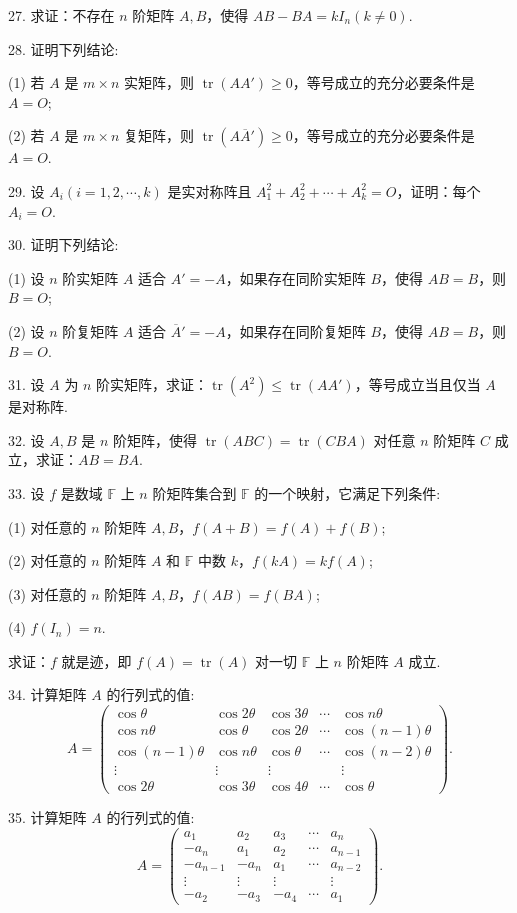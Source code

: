 \documentclass[UTF8, 12pt, fontset=fandol, oneside]{ctexart}
\begin{document}
27. 求证：不存在 $n$ 阶矩阵 $A,B$，使得 $AB-BA=kI_n(k\neq 0)$.

28. 证明下列结论:

(1) 若 $A$ 是 $m\times n$ 实矩阵，则 $\operatorname{tr}(AA')\geq 0$，等号成立的充分必要条件是 $A=O$;

(2) 若 $A$ 是 $m\times n$ 复矩阵，则 $\operatorname{tr}(A\overline{A}')\geq 0$，等号成立的充分必要条件是 $A=O$.

29. 设 $A_i(i=1,2,\cdots,k)$ 是实对称阵且 $A_1^2+A_2^2+\cdots+A_k^2=O$，证明：每个 $A_i=O$.

30. 证明下列结论:

(1) 设 $n$ 阶实矩阵 $A$ 适合 $A'=-A$，如果存在同阶实矩阵 $B$，使得 $AB=B$，则 $B=O$;

(2) 设 $n$ 阶复矩阵 $A$ 适合 $\overline{A}'=-A$，如果存在同阶复矩阵 $B$，使得 $AB=B$，则 $B=O$.

31. 设 $A$ 为 $n$ 阶实矩阵，求证：$\operatorname{tr}(A^2)\leq \operatorname{tr}(AA')$，等号成立当且仅当 $A$ 是对称阵.

32. 设 $A,B$ 是 $n$ 阶矩阵，使得 $\operatorname{tr}(ABC)=\operatorname{tr}(CBA)$ 对任意 $n$ 阶矩阵 $C$ 成立，求证：$AB=BA$.

33. 设 $f$ 是数域 $\mathbb{F}$ 上 $n$ 阶矩阵集合到 $\mathbb{F}$ 的一个映射，它满足下列条件:

(1) 对任意的 $n$ 阶矩阵 $A,B$，$f(A+B)=f(A)+f(B)$;

(2) 对任意的 $n$ 阶矩阵 $A$ 和 $\mathbb{F}$ 中数 $k$，$f(kA)=kf(A)$;

(3) 对任意的 $n$ 阶矩阵 $A,B$，$f(AB)=f(BA)$;

(4) $f(I_n)=n$.

求证：$f$ 就是迹，即 $f(A)=\operatorname{tr}(A)$ 对一切 $\mathbb{F}$ 上 $n$ 阶矩阵 $A$ 成立.

34. 计算矩阵 $A$ 的行列式的值:
\[
A=\left(\begin{array}{ccccc}
\cos\theta & \cos2\theta & \cos3\theta & \cdots & \cos n\theta\\
\cos n\theta & \cos\theta & \cos2\theta & \cdots & \cos(n-1)\theta\\
\cos(n-1)\theta & \cos n\theta & \cos\theta & \cdots & \cos(n-2)\theta\\
\vdots & \vdots & \vdots & & \vdots\\
\cos2\theta & \cos3\theta & \cos4\theta & \cdots & \cos\theta
\end{array}\right).
\]

35. 计算矩阵 $A$ 的行列式的值:
\[
A=\left(\begin{array}{ccccc}
a_1 & a_2 & a_3 & \cdots & a_n\\
-a_n & a_1 & a_2 & \cdots & a_{n-1}\\
-a_{n-1} & -a_n & a_1 & \cdots & a_{n-2}\\
\vdots & \vdots & \vdots & & \vdots\\
-a_2 & -a_3 & -a_4 & \cdots & a_1
\end{array}\right).
\]
\end{document}

